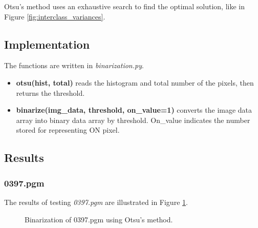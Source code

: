 \documentclass[paper=a4, fontsize=11pt]{scrartcl}
\numberwithin{equation}{section}		%
\numberwithin{figure}{section}			%
\numberwithin{table}{section}				%
\begin{document}
Otsu's method uses an exhaustive search to find the optimal solution, like in Figure \ref{fig:interclass_variances}. 

\subsection{Implementation}

The functions are written in \emph{binarization.py}.

\begin{itemize}
\item \textbf{ otsu(hist, total) } reads the histogram and total number of the pixels, then returns the threshold.
\item \textbf{ binarize(img\_data, threshold, on\_value=1) } converts the image data array into binary data array by threshold.
On\_value indicates the number stored for representing ON pixel.
\end{itemize}

\subsection{Results}

\subsubsection{0397.pgm}

The results of testing \emph{0397.pgm} are illustrated in Figure \ref{fig:binary:01}.

\begin{figure}[h]
\centering
{}
\caption{Binarization of 0397.pgm using Otsu's method.}\label{fig:binary:01}
\end{figure}
\end{document}
